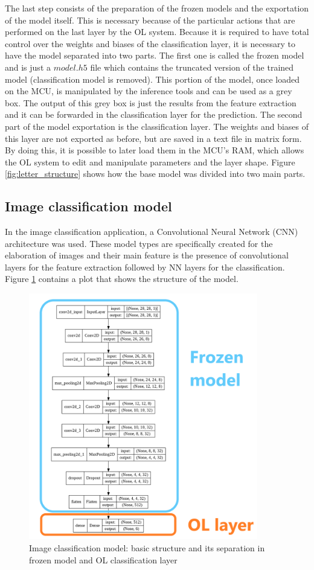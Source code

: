 \documentclass[12pt]{report}
\begin{document}
The last step consists of the preparation of the frozen models and the exportation of the model itself. This is necessary because of the particular actions that are performed on the last layer by the OL system. Because it is required to have total control over the weights and biases of the classification layer, it is necessary to have the model separated into two parts. The first one is called the frozen model and is just a $model.h5$ file which contains the truncated version of the trained model (classification model is removed). This portion of the model, once loaded on the MCU, is manipulated by the inference tools and can be used as a grey box. The output of this grey box is just the results from the feature extraction and it can be forwarded in the classification layer for the prediction.
The second part of the model exportation is the classification layer. The weights and biases of this layer are not exported as before, but are saved in a text file in matrix form. By doing this, it is possible to later load them in the MCU's RAM, which allows the OL system to edit and manipulate parameters and the layer shape. 
Figure \ref{fig:letter_structure} shows how the base model was divided into two main parts.

\subsection{Image classification model}
In the image classification application, a Convolutional Neural Network (CNN) architecture was used. These model types are specifically created for the elaboration of images and their main feature is the presence of convolutional layers for the feature extraction followed by NN layers for the classification. Figure \ref{fig:openmv_structure} contains a plot that shows the structure of the model.\\

\begin{figure}[h!]
    \centering
    \includegraphics[width=100mm]{Figures/Chapter4/openmv_structure.png} 
    \caption{Image classification model: basic structure and its separation in frozen model and OL classification layer}
    \label{fig:openmv_structure}    
\end{figure}
\end{document}

